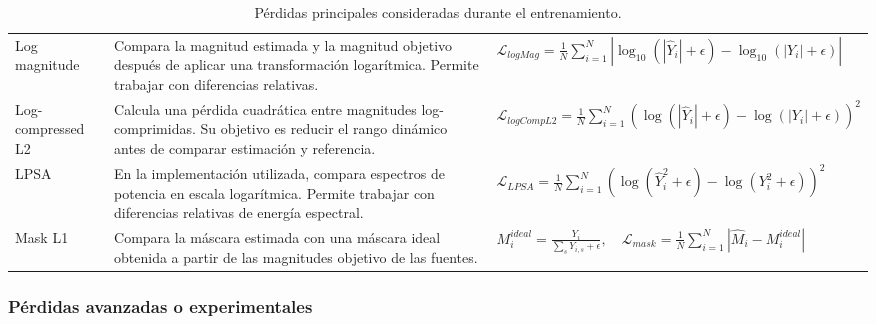 \begin{table}[H]
\begin{adjustbox}{max width=\textwidth}
\begin{tabular}{p{} p{} p{}}
            Log magnitude &
            Compara la magnitud estimada y la magnitud objetivo después de aplicar una transformación logarítmica. Permite trabajar con diferencias relativas. &
            \( \mathcal{L}_{logMag} = \frac{1}{N}\sum_{i=1}^{N}\left|\log_{10}(|\hat{Y}_i|+\epsilon)-\log_{10}(|Y_i|+\epsilon)\right| \)
            \\

            Log-compressed L2 &
            Calcula una pérdida cuadrática entre magnitudes log-comprimidas. Su objetivo es reducir el rango dinámico antes de comparar estimación y referencia. &
            \( \mathcal{L}_{logCompL2} = \frac{1}{N}\sum_{i=1}^{N}\left(\log(|\hat{Y}_i|+\epsilon)-\log(|Y_i|+\epsilon)\right)^2 \)
            \\

            LPSA &
            En la implementación utilizada, compara espectros de potencia en escala logarítmica. Permite trabajar con diferencias relativas de energía espectral. &
            \( \mathcal{L}_{LPSA} = \frac{1}{N}\sum_{i=1}^{N}\left(\log(\hat{Y}_i^2+\epsilon)-\log(Y_i^2+\epsilon)\right)^2 \)
            \\

            Mask L1 &
            Compara la máscara estimada con una máscara ideal obtenida a partir de las magnitudes objetivo de las fuentes. &
            \( M_i^{ideal} = \frac{Y_i}{\sum_s Y_{i,s}+\epsilon}, \quad \mathcal{L}_{mask} = \frac{1}{N}\sum_{i=1}^{N}|\hat{M}_i - M_i^{ideal}| \)
            \\

            \bottomrule
        \end{tabular}
    \end{adjustbox}
    \caption{Pérdidas principales consideradas durante el entrenamiento.}
    \label{tab:perdidas-principales}
\end{table}

\subsubsection{Pérdidas avanzadas o experimentales}

